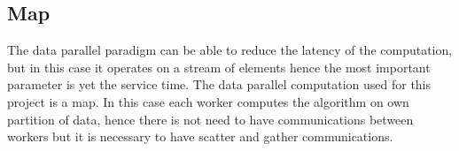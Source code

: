 \subsection{Map}

The data parallel paradigm can be able to reduce the latency of the computation, but in this case it operates on a stream of elements hence the most important parameter is yet the service time. The data parallel computation used for this project is a map. In this case each worker computes the algorithm on own partition of data, hence there is not need to have communications between workers but it is necessary to have scatter and gather communications.